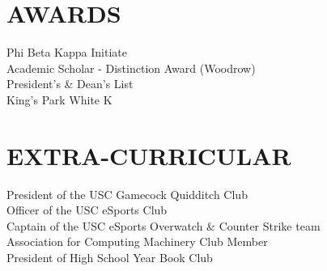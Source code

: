 \documentclass[line,margin]{res}
\begin{document}
\begin{resume}
\section{AWARDS}Phi Beta Kappa Initiate \\
				Academic Scholar - Distinction Award (Woodrow) \\
				President's \& Dean's List \\  
				King's Park White K

\section{EXTRA-CURRICULAR}
				President of the USC Gamecock Quidditch Club \\
				Officer of the USC eSports Club \\
				Captain of the USC eSports Overwatch \& Counter Strike team \\
				Association for Computing Machinery Club Member \\
				President of High School Year Book Club
\end{resume}
\end{document}
